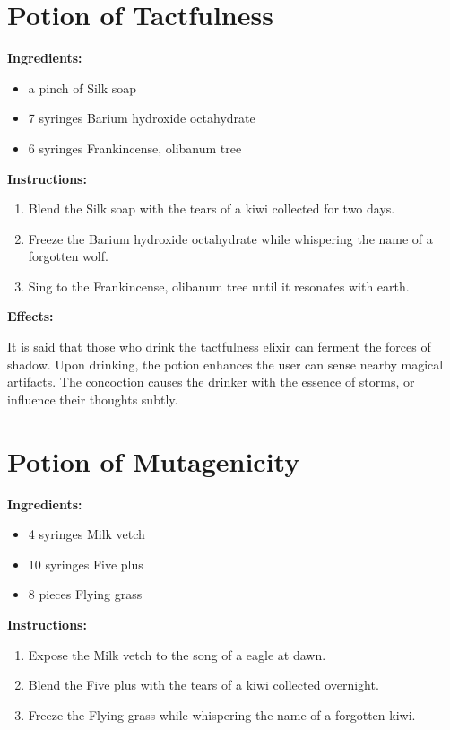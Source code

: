 \documentclass{article}
\begin{document}
\newpage
\section*{Potion of Tactfulness}

\textbf{Ingredients:}

\begin{itemize}
  \item a pinch of Silk soap
  \item 7 syringes Barium hydroxide octahydrate
  \item 6 syringes Frankincense, olibanum tree
\end{itemize}

\textbf{Instructions:}

\begin{enumerate}
  \item Blend the Silk soap with the tears of a kiwi collected for two days.
  \item Freeze the Barium hydroxide octahydrate while whispering the name of a forgotten wolf.
  \item Sing to the Frankincense, olibanum tree until it resonates with earth.
\end{enumerate}

\textbf{Effects:}

It is said that those who drink the tactfulness elixir can ferment the forces of shadow. Upon drinking, the potion enhances the user can sense nearby magical artifacts. The concoction causes the drinker with the essence of storms, or influence their thoughts subtly.

\newpage
\section*{Potion of Mutagenicity}

\textbf{Ingredients:}

\begin{itemize}
  \item 4 syringes Milk vetch
  \item 10 syringes Five plus
  \item 8 pieces Flying grass
\end{itemize}

\textbf{Instructions:}

\begin{enumerate}
  \item Expose the Milk vetch to the song of a eagle at dawn.
  \item Blend the Five plus with the tears of a kiwi collected overnight.
  \item Freeze the Flying grass while whispering the name of a forgotten kiwi.
\end{enumerate}
\end{document}
